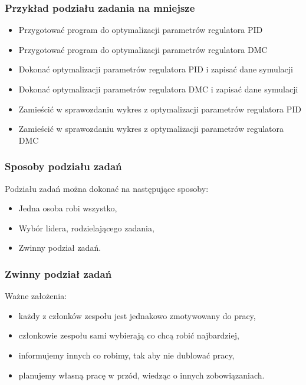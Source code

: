 \begin{frame}
    \frametitle{Przykład podziału zadania na mniejsze}
    \begin{itemize}
        \item Przygotować program do optymalizacji parametrów regulatora PID
        \item Przygotować program do optymalizacji parametrów regulatora DMC
        \item Dokonać optymalizacji parametrów regulatora PID i zapisać dane symulacji
        \item Dokonać optymalizacji parametrów regulatora DMC i zapisać dane symulacji
        \item Zamieścić w sprawozdaniu wykres z optymalizacji parametrów regulatora PID
        \item Zamieścić w sprawozdaniu wykres z optymalizacji parametrów regulatora DMC      
    \end{itemize}
\end{frame}

\begin{frame}
    \frametitle{Sposoby podziału zadań}
    Podziału zadań można dokonać na następujące sposoby:
    \pause
    \begin{itemize}[<+->]
        \item Jedna osoba robi wszystko,
        \item Wybór lidera, rodzielającego zadania,
        \item Zwinny podział zadań.
    \end{itemize}
\end{frame}

\begin{frame}
    \frametitle{Zwinny podział zadań}
    Ważne założenia:
    \pause
    \begin{itemize}[<+->]
        \item każdy z członków zespołu jest jednakowo zmotywowany do pracy,
        \item członkowie zespołu sami wybierają co chcą robić najbardziej,
        \item informujemy innych co robimy, tak aby nie dublować pracy,
        \item planujemy własną pracę w przód, wiedząc o innych zobowiązaniach. 
    \end{itemize}
\end{frame}
